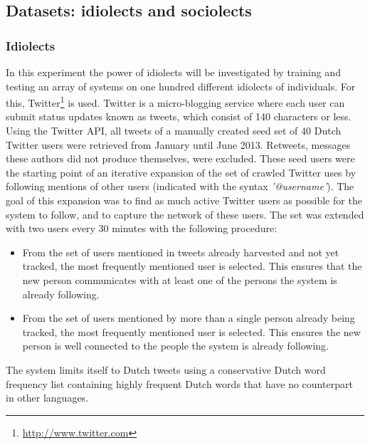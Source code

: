 \documentclass[12pt]{article}
\begin{document}
\subsection{Datasets: idiolects and sociolects} \label{model}

\subsubsection{Idiolects} \label{idiolects}

In this experiment the power of idiolects will be investigated by training and testing an array of systems on one hundred different idiolects of individuals. For this, Twitter\footnote{\url{http://www.twitter.com}} is used. Twitter is a micro-blogging service where each user can submit status updates known as tweets, which consist of 140 characters or less. Using the Twitter API, all tweets of a manually created seed set of 40 Dutch Twitter users were retrieved from January until June 2013. Retweets, messages these authors did not produce themselves, were excluded. These seed users were the starting point of an iterative expansion of the set of crawled Twitter uses by following mentions of other users (indicated with the syntax \emph{'@username'}). The goal of this expansion was to find as much active Twitter users as possible for the system to follow, and to capture the network of these users. The set was extended with two users every 30 minutes with the following procedure:

\begin{itemize}
\item From the set of users mentioned in tweets already harvested and not yet tracked, the most frequently mentioned user is selected. This ensures that the new person communicates with at least one of the persons the system is already following.
\item From the set of users mentioned by more than a single person already being tracked, the most frequently mentioned user is selected. This ensures the new person is well connected to the people the system is already following.
\end{itemize}

The system limits itself to Dutch tweets using a conservative Dutch word frequency list containing highly frequent Dutch words that have no counterpart in other languages.
\end{document}
